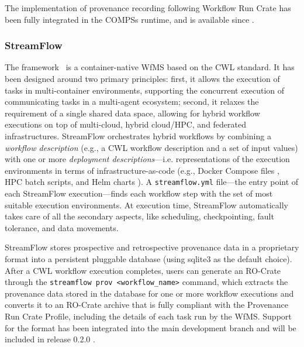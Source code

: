 The implementation of provenance recording following Workflow Run Crate has been fully integrated in the COMPSs runtime, and is available since  \cite{Ejarque 2023}.


\subsubsection{StreamFlow}\label{ch54:streamflow}

The  framework~\cite{Colonnelli 2021} is a container-native \acrshort{WfMS} based on the \acrshort{CWL} standard.
It has been designed around two primary principles: first, it allows the execution of tasks in multi-container environments, supporting the concurrent execution of communicating tasks in a multi-agent ecosystem; second, it relaxes the requirement of a single shared data space, allowing for hybrid workflow executions on top of multi-cloud, hybrid cloud/HPC, and federated infrastructures.
StreamFlow orchestrates hybrid workflows by combining a \emph{workflow description} (e.g., a CWL workflow description and a set of input values) with one or more \emph{deployment descriptions}---i.e.
representations of the execution environments in terms of infrastructure-as-code (e.g., Docker Compose files \cite{Reis 2022}, HPC batch scripts, and Helm charts \cite{Zerouali 2023}).
A \texttt{streamflow.yml} file---the entry point of each StreamFlow execution---finds each workflow step with the set of most suitable execution environments.
At execution time, StreamFlow automatically takes care of all the secondary aspects, like scheduling, checkpointing, fault tolerance, and data movements.

StreamFlow stores prospective and retrospective provenance data in a proprietary format into a persistent pluggable database (using sqlite3 as the default choice).
After a CWL workflow execution completes, users can generate an RO-Crate through the \texttt{streamflow prov <workflow\_name>}
command, which extracts the provenance data stored in the database for one or more workflow executions and converts it to an RO-Crate archive that is fully compliant with the Provenance Run Crate Profile, including the details of each task run by the WfMS.
Support for the format has been integrated into the main development branch and will be included in release 0.2.0 \cite{Colonnelli 2023b}.

